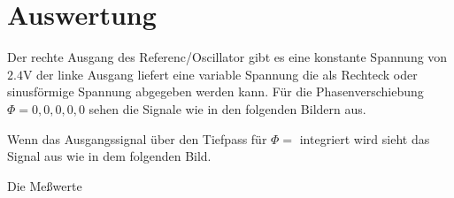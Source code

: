 \section{Auswertung}
\label{sec:Auswertung}
Der rechte Ausgang des Referenc/Oscillator gibt es eine konstante Spannung
von $2.4\si{\volt}$ der linke Ausgang liefert eine variable Spannung die
als Rechteck oder sinusförmige Spannung abgegeben werden kann. Für die
Phasenverschiebung $\Phi=0,0,0,0,0$ sehen die Signale wie in den folgenden
Bildern aus.
\begin{figure}
\end{figure}
Wenn das Ausgangssignal über den Tiefpass für $\Phi=$ integriert wird sieht das
Signal aus wie in dem folgenden Bild.
\begin{figure}
\end{figure}
Die Meßwerte
